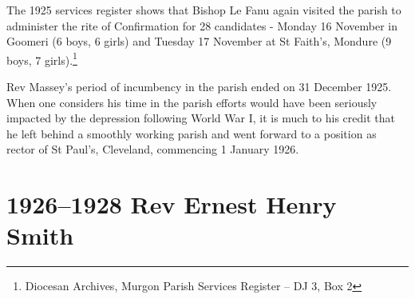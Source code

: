 \smallskip


The 1925 services register shows that Bishop Le Fanu again visited the parish to administer the rite of Confirmation for 28 candidates - Monday 16 November in Goomeri (6 boys, 6 girls) and Tuesday 17 November at St Faith's, Mondure (9 boys, 7 girls).\footnote{Diocesan Archives, Murgon Parish Services Register -- DJ 3, Box 2}


Rev Massey's period of incumbency in the parish ended on 31 December 1925. When one considers his time in the parish efforts would have been seriously impacted by the depression following World War I, it is much to his credit that he left behind a smoothly working parish and went forward to a position as rector of St Paul's, Cleveland, commencing 1 January 1926.



\balance


\printendnotes[custom]
\setcounter{endnote}{0}
\chapter{1926--1928 Rev Ernest Henry Smith}
\nobalance








